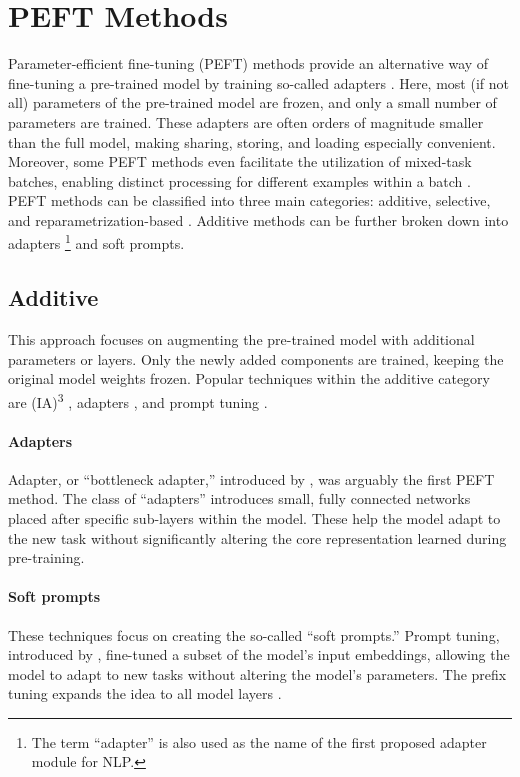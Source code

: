 \documentclass[12pt]{book}
\begin{document}
\section{PEFT Methods}
\label{chap:peft-methods}
Parameter-efficient fine-tuning (PEFT) methods provide an alternative way of fine-tuning a pre-trained model by training so-called adapters \citep{Ding2023ParameterefficientFO}. Here, most (if not all) parameters of the pre-trained model are frozen, and only a small number of parameters are trained. These adapters are often orders of magnitude smaller than the full model, making sharing, storing, and loading especially convenient. Moreover, some PEFT methods even facilitate the utilization of mixed-task batches, enabling distinct processing for different examples within a batch \citep{Lester2021ThePO}.
PEFT methods can be classified into three main categories: additive, selective, and reparametrization-based \citep{lialin2023scaling}. Additive methods can be further broken down into adapters \footnote{The term ``adapter'' is also used as the name of the first proposed adapter module for NLP.} and soft prompts.

\subsection{Additive}
This approach focuses on augmenting the pre-trained model with additional parameters or layers. Only the newly added components are trained, keeping the original model weights frozen. Popular techniques within the additive category are (IA)\textsuperscript{3} \citep{Liu2022FewShotPF}, adapters \citep{houlsby2019parameter}, and prompt tuning \citep{Lester2021ThePO}.

\paragraph{Adapters}
Adapter, or ``bottleneck adapter,'' introduced by \citet{houlsby2019parameter}, was arguably the first PEFT method. The class of ``adapters'' introduces small, fully connected networks placed after specific sub-layers within the model. These help the model adapt to the new task without significantly altering the core representation learned during pre-training.

\paragraph{Soft prompts}
These techniques focus on creating the so-called ``soft prompts.'' Prompt tuning, introduced by \citet{Lester2021ThePO}, fine-tuned a subset of the model's input embeddings, allowing the model to adapt to new tasks without altering the model's parameters. The prefix tuning expands the idea to all model layers \citep{li-liang-2021-prefix}. 
\end{document}

